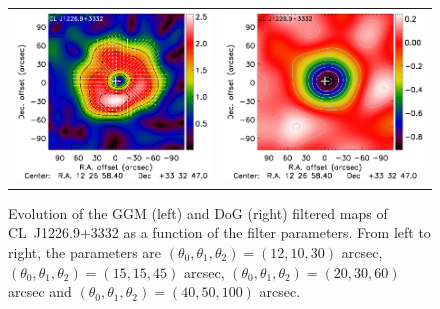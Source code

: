 \documentclass[twocolumn,traditabstract]{aa}
\begin{document}
\begin{figure}[h]
{\begin{tabular}{ll}
\includegraphics[trim=0cm 0.7cm 0cm 0cm, clip=true, scale=1]{Figure/Grad_CLJ1227_40_50_100_noannot.pdf} & 
\includegraphics[trim=2.3cm 0.7cm 0cm 0cm, clip=true, scale=1]{Figure/DoG_CLJ1227_40_50_100_noannot.pdf}
\end{tabular}}
\caption{\footnotesize{Evolution of the GGM (left) and DoG (right) filtered maps of \mbox{CL~J1226.9+3332} as a function of the filter parameters. From left to right, the parameters are $\left(\theta_0, \theta_1, \theta_2\right) = \left(12, 10, 30\right)$ arcsec, $\left(\theta_0, \theta_1, \theta_2\right) = \left(15, 15, 45\right)$ arcsec, $\left(\theta_0, \theta_1, \theta_2\right) = \left(20, 30, 60\right)$ arcsec and $\left(\theta_0, \theta_1, \theta_2\right) = \left(40, 50, 100\right)$ arcsec.}}
\label{fig:filtered_NIKA_maps_evolution}
\end{figure}
\end{document}
